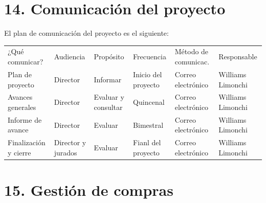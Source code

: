 \documentclass[11pt]{charter}
\begin{document}
\section{14. Comunicación del proyecto}
\label{sec:comunicaciones}
El plan de comunicación del proyecto es el siguiente:
\begin{table}[htpb]
\centering
\begin{tabularx}{\linewidth}{@{}|X|C{2cm}|C{2cm}|C{2.2cm}|C{2cm}|C{2.1cm}|@{}}
\hline
{} 
           \\ \hline
{} 
¿Qué comunicar? & Audiencia      & Propósito & Frecuencia & Método de comunicac. & Responsable \\ \hline
Plan de proyecto      & Director & Informar & Inicio del proyecto & Correo electrónico & Williams Limonchi \\ \hline
Avances generales     & Director & Evaluar y consultar & Quincenal & Correo electrónico & Williams Limonchi \\ \hline
Informe de avance     & Director & Evaluar             & Bimestral & Correo electrónico & Williams Limonchi \\ \hline
Finalización y cierre & Director y jurados & Evaluar   & Fianl del proyecto & Correo electrónico & Williams Limonchi \\ \hline
\end{tabularx}
\end{table}

\section{15. Gestión de compras}
\label{sec:compras}
\end{document}
